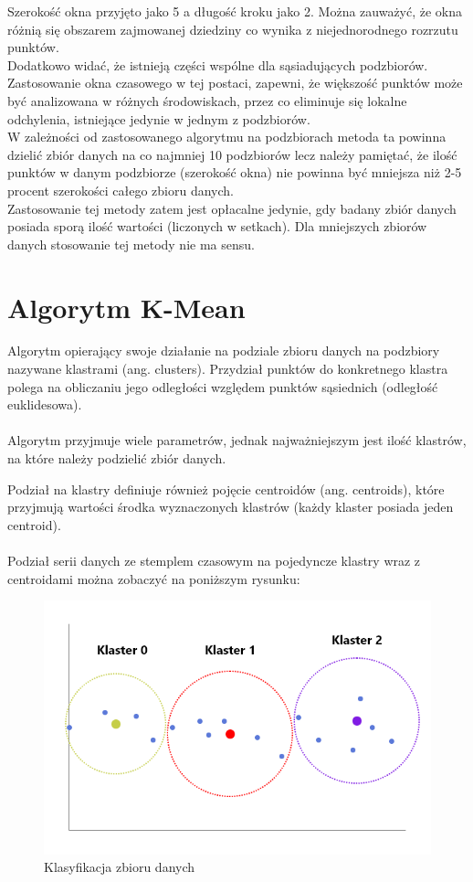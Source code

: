 \documentclass[eng,printmode]{mgr}
\begin{document}
Szerokość okna przyjęto jako 5 a długość kroku jako 2. Można zauważyć, że okna różnią się obszarem zajmowanej dziedziny co wynika z niejednorodnego rozrzutu punktów.
\\
Dodatkowo widać, że istnieją części wspólne dla sąsiadujących podzbiorów. Zastosowanie okna czasowego w tej postaci, zapewni, że większość punktów może być analizowana w różnych środowiskach, przez co eliminuje się lokalne odchylenia, istniejące jedynie w jednym z podzbiorów.
\\
W zależności od zastosowanego algorytmu na podzbiorach metoda ta powinna dzielić zbiór danych na co najmniej 10 podzbiorów lecz należy pamiętać, że ilość punktów w danym podzbiorze (szerokość okna) nie powinna być mniejsza niż 2-5 procent szerokości całego zbioru danych.
\\
Zastosowanie tej metody zatem jest opłacalne jedynie, gdy badany zbiór danych posiada sporą ilość wartości (liczonych w setkach). Dla mniejszych zbiorów danych stosowanie tej metody nie ma sensu. 

\section{Algorytm K-Mean}
Algorytm opierający swoje działanie na podziale zbioru danych na podzbiory nazywane klastrami (ang. clusters). Przydział punktów do konkretnego klastra polega na obliczaniu jego odległości względem punktów sąsiednich (odległość euklidesowa). \\ \\
Algorytm przyjmuje wiele parametrów, jednak najważniejszym jest ilość klastrów, na które należy podzielić zbiór danych.

Podział na klastry definiuje również pojęcie centroidów (ang. centroids), które przyjmują wartości środka wyznaczonych klastrów (każdy klaster posiada jeden centroid). \\ \\

Podział serii danych ze stemplem czasowym na pojedyncze klastry wraz z centroidami można zobaczyć na poniższym rysunku:

\begin{figure}[H]
  \begin{center}
  \includegraphics[scale=0.7]{KMean}
  \end{center}
  \caption{Klasyfikacja zbioru danych}
\end{figure}
\end{document}

